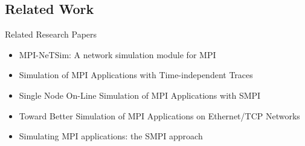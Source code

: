 \documentclass[pdf]{beamer}
\begin{document}
\subsection{Related Work}
\begin{frame}{Related Research Papers}
  \begin{itemize}
    \item MPI-NeTSim: A network simulation module for MPI \cite{netsim}
    \item Simulation of MPI Applications with Time-independent Traces
      \cite{time-independent-trace-sim}
    \item Single Node On-Line Simulation of MPI Applications with SMPI
      \cite{smpi-online}
    \item Toward Better Simulation of MPI Applications on Ethernet/TCP
      Networks \cite{better-sim-ethernet}
    \item Simulating MPI applications: the SMPI approach \cite{smpi}
  \end{itemize}
\end{frame}
\end{document}
